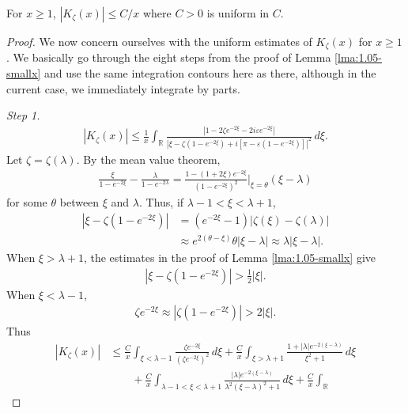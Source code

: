 \documentclass[GreensFunctions.tex]{subfiles}
\begin{document}
\begin{lma}\label{lma:1.05-bigx}
	For $x \geq 1$, $\left|K_\zeta(x)\right| \leq C/x$ where $C>0$ is uniform in $C$.
\end{lma}
\begin{proof}
	We now concern ourselves with the uniform estimates of $K_\zeta(x)$ for $x\ge 1$. 
	We basically go through the eight steps from the proof of Lemma \ref{lma:1.05-smallx}
	and use the same integration contours here as there, although in the current case, we 
	immediately integrate by parts.


	{\em Step 1.}
	\begin{align*}
		\left|K_\zeta(x)\right| 
			\le 
				\frac1x
				\int_{\mathbb R} 
					\frac{|1-2\zeta e^{-2\xi}-2i\varepsilon e^{-2\xi}|}
						{|\xi-\zeta(1-e^{-2\xi})+i[\pi -\varepsilon(1-e^{-2\xi})]|^2}
					\,d\xi.
	\end{align*}
	Let $\zeta=\zeta(\lambda)$. By the mean value theorem,
	\begin{align*}
		\frac{\xi}{1-e^{-2\xi}}-\frac{\lambda}{1-e^{-2\lambda}} 
			= \frac{1-(1+2\xi)e^{-2\xi}}{(1-e^{-2\xi})^2}\bigg|_{\xi=\theta}(\xi-\lambda)
	\end{align*}
	for some $\theta$ between $\xi$ and $\lambda$. Thus, if $\lambda-1<\xi<\lambda +1$,
	\begin{align*}
		|\xi-\zeta(1-e^{-2\xi})| 
			&= (e^{-2\xi}-1)|\zeta(\xi)-\zeta(\lambda)|\\
			&\approx e^{2(\theta-\xi)}\theta|\xi-\lambda|
			\approx \lambda|\xi-\lambda|.
	\end{align*}
	When $\xi>\lambda+1$, the estimates in the proof of Lemma \ref{lma:1.05-smallx} give
	\begin{align*}
		|\xi - \zeta(1-e^{-2\xi})|
			>\frac12|\xi|.
	\end{align*}
	When $\xi<\lambda-1$, 
	\begin{align*}
		\zeta e^{-2\xi}
			\approx |\zeta(1-e^{-2\xi})|>2|\xi|.
	\end{align*}
	Thus
	\begin{align*}
		|K_\zeta(x)|
			&\le \frac Cx 
				\int_{\xi<\lambda-1}
					\frac{\zeta e^{-2\xi}}{(\zeta e^{-2\xi})^2}
				\,d\xi 
				+ \frac Cx 
				\int_{\xi>\lambda+1}
					\frac{1+|\lambda| e^{-2(\xi-\lambda)}}{\xi^2+1}
				\,d\xi
				\\
			&\qquad+
				\frac Cx 
					\int_{\lambda-1<\xi<\lambda+1}
						\frac{|\lambda| e^{-2(\xi-\lambda)}}{\lambda^2(\xi-\lambda)^2+1}
					\,d\xi 
					+ \frac Cx 
					\int_{\mathbb R} 

\end{align*}
\end{proof}
\end{document}

